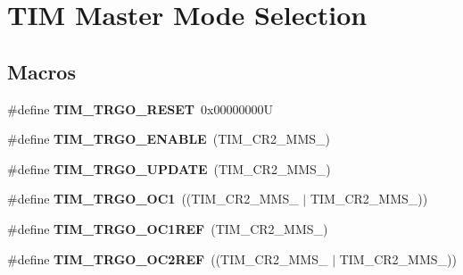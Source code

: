 \hypertarget{group___t_i_m___master___mode___selection}{}\section{T\+IM Master Mode Selection}
\label{group___t_i_m___master___mode___selection}
\subsection*{Macros}
\begin{DoxyCompactItemize}
\item 
\mbox{\label{group___t_i_m___master___mode___selection_ga32a8e436f2c0818a657b0d3fcf4e872d}} 
\#define {\bfseries T\+I\+M\+\_\+\+T\+R\+G\+O\+\_\+\+R\+E\+S\+ET}~0x00000000U
\item 
\mbox{\label{group___t_i_m___master___mode___selection_ga4ac300b0fd24d1e6532e5961680a39a9}} 
\#define {\bfseries T\+I\+M\+\_\+\+T\+R\+G\+O\+\_\+\+E\+N\+A\+B\+LE}~(T\+I\+M\+\_\+\+C\+R2\+\_\+\+M\+M\+S\+\_)
\item 
\mbox{\label{group___t_i_m___master___mode___selection_ga27521aebd507e562fe7fba6dfc639a67}} 
\#define {\bfseries T\+I\+M\+\_\+\+T\+R\+G\+O\+\_\+\+U\+P\+D\+A\+TE}~(T\+I\+M\+\_\+\+C\+R2\+\_\+\+M\+M\+S\+\_)
\item 
\mbox{\label{group___t_i_m___master___mode___selection_ga80aa9a9c41de509d99fc4cb492d6513f}} 
\#define {\bfseries T\+I\+M\+\_\+\+T\+R\+G\+O\+\_\+\+O\+C1}~((T\+I\+M\+\_\+\+C\+R2\+\_\+\+M\+M\+S\+\_ $\vert$ T\+I\+M\+\_\+\+C\+R2\+\_\+\+M\+M\+S\+\_))
\item 
\mbox{\label{group___t_i_m___master___mode___selection_gaed715aa7ec4ad0f7f5d82dde6d964178}} 
\#define {\bfseries T\+I\+M\+\_\+\+T\+R\+G\+O\+\_\+\+O\+C1\+R\+EF}~(T\+I\+M\+\_\+\+C\+R2\+\_\+\+M\+M\+S\+\_)
\item 
\mbox{\label{group___t_i_m___master___mode___selection_gaaedc4b3f4c5c3c8b45a2cf1b73e33c0a}} 
\#define {\bfseries T\+I\+M\+\_\+\+T\+R\+G\+O\+\_\+\+O\+C2\+R\+EF}~((T\+I\+M\+\_\+\+C\+R2\+\_\+\+M\+M\+S\+\_ $\vert$ T\+I\+M\+\_\+\+C\+R2\+\_\+\+M\+M\+S\+\_))

\end{DoxyCompactItemize}
